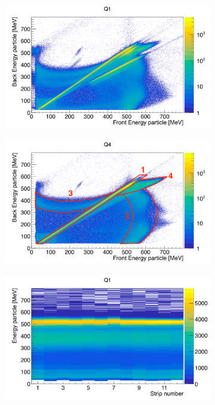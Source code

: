 \documentclass[twoside,english]{uiofysmaster/uiofysmaster}
\begin{document}
\begin{figure}[htb]
	\centering
	\begin{subfigure}[t]{0.49\textwidth}
		\centering
		\includegraphics[width=\textwidth]{../Plots/plotting/E_f_b_Q1-online.png}
		\caption{}
		\label{fig:CD_cal_online}
	\end{subfigure}
	\hfill
	\begin{subfigure}[t]{0.49\textwidth}
		\centering
		\includegraphics[width=\textwidth]{../Plots/plotting/E_f_b_Q4-user-drawing.png}
		\caption{}
		\label{fig:EFBQ4}
	\end{subfigure}
	\begin{subfigure}[t]{0.49\textwidth}
		\centering
		\includegraphics[width=\textwidth]{../Plots/plotting/E_vs_b-strip_Q1.png}

\end{subfigure}
\end{figure}
\end{document}
